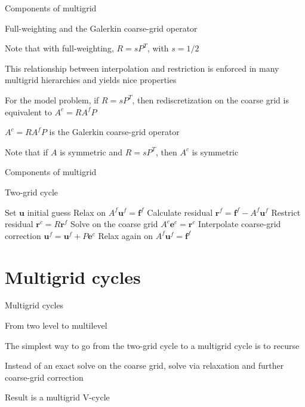 \documentclass[18pt,xcolor=table]{beamer}
\begin{document}
\begin{frame}{Components of multigrid}
\begin{block}{Full-weighting and the Galerkin coarse-grid operator}
\bit
\item Note that with full-weighting, $R = sP^T$, with $s = 1/2$
\item This relationship between interpolation and restriction is enforced in many multigrid hierarchies and yields nice properties
\item For the model problem, if $R = sP^T$, then rediscretization on the coarse grid is equivalent to $A^c = RA^fP$
\item $A^c = RA^fP$ is the Galerkin coarse-grid operator
\item Note that if $A$ is symmetric and $R = sP^T$, then $A^c$ is symmetric
\eit
\end{block}
\end{frame}

\begin{frame}{Components of multigrid}
\begin{block}{Two-grid cycle}
\begin{algorithm}[H]
\caption{Two-grid cycle}
\begin{algorithmic}
\State Set $\mathbf{u}$ initial guess
\State Relax on $A^f\mathbf{u}^f = \mathbf{f}^f$
\State Calculate residual $\mathbf{r}^f = \mathbf{f}^f - A^f\mathbf{u}^f$
\State Restrict residual $\mathbf{r}^c = R\mathbf{r}^f$
\State Solve on the coarse grid $A^c\mathbf{e}^c = \mathbf{r}^c$
\State Interpolate coarse-grid correction $\mathbf{u}^f = \mathbf{u}^f + P\mathbf{e}^c$
\State Relax again on $A^f\mathbf{u}^f = \mathbf{f}^f$
\end{algorithmic}
\end{algorithm}
\end{block}
\end{frame}


\section{Multigrid cycles}

\begin{frame}{Multigrid cycles}
\begin{block}{From two level to multilevel}
\bit
\item The simplest way to go from the two-grid cycle to a multigrid cycle is to recurse
\item Instead of an exact solve on the coarse grid, solve via relaxation and further coarse-grid correction
\item Result is a multigrid V-cycle
\eit
\end{block}
\end{frame}
\end{document}
